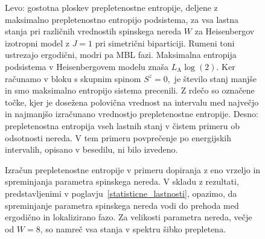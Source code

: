  \begin{figure}[H]
\caption{Levo: gostotna ploskev prepletenostne entropije, deljene z maksimalno prepletenostno entropijo podsistema, za vsa lastna stanja pri različnih vrednostih spinskega nereda $W$ za Heisenbergov izotropni model z $J=1$ pri simetrični biparticiji. Rumeni toni ustrezajo ergodični, modri pa MBL fazi. Maksimalna entropija podsistema v Heisenbergovem modelu znaša $L_\mathrm{A}\log(2).$ Ker računamo v bloku s skupnim spinom $S^z=0,$ je število stanj manjše in smo maksimalno entropijo sistema precenili. Z rdečo so označene točke, kjer je dosežena polovična vrednost na intervalu med največjo in najmanjšo izračunano vrednostjo prepletenostne entropije. Desno: prepletenostna entropija vseh lastnih stanj v čistem primeru ob odsotnosti nereda. V tem primeru povprečenje po energijskih intervalih, opisano v besedilu, ni bilo izvedeno.    }
\label{fig:W_ent_entro_density_14_7_0}
\end{figure} 

 \begin{figure}[H]
\caption{Izračun prepletenostne entropije v primeru dopiranja z eno vrzeljo in spreminjanja parametra spinskega nereda. V skladu z rezultati, predstavljenimi v poglavju~\ref{statisticne_lastnosti}, opazimo, da spreminjanje parametra spinskega nereda vodi do prehoda med ergodično in lokalizirano fazo. Za velikosti parametra nereda, večje od $W=8$, so namreč vsa stanja v spektru šibko prepletena. }
\label{fig:W_ent_entro_density_11_5_1}
\end{figure} 

